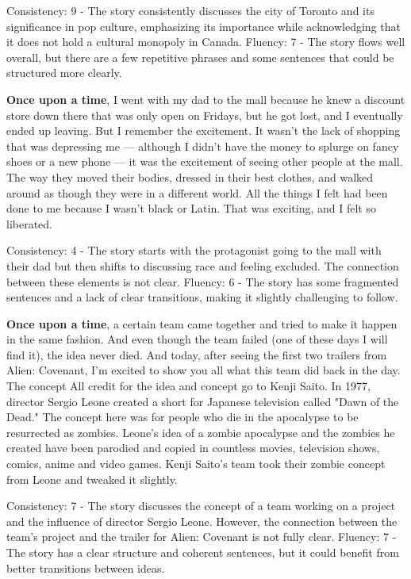 \documentclass{article}
\begin{document}
Consistency: 9 - The story consistently discusses the city of Toronto and its significance in pop culture, emphasizing its importance while acknowledging that it does not hold a cultural monopoly in Canada.
Fluency: 7 - The story flows well overall, but there are a few repetitive phrases and some sentences that could be structured more clearly.

\textbf{Once upon a time}, I went with my dad to the mall because he knew a discount store down there that was only open on Fridays, but he got lost, and I eventually ended up leaving. But I remember the excitement. It wasn't the lack of shopping that was depressing me — although I didn't have the money to splurge on fancy shoes or a new phone — it was the excitement of seeing other people at the mall. The way they moved their bodies, dressed in their best clothes, and walked around as though they were in a different world. All the things I felt had been done to me because I wasn't black or Latin. That was exciting, and I felt so liberated.

Consistency: 4 - The story starts with the protagonist going to the mall with their dad but then shifts to discussing race and feeling excluded. The connection between these elements is not clear.
Fluency: 6 - The story has some fragmented sentences and a lack of clear transitions, making it slightly challenging to follow.

\textbf{Once upon a time}, a certain team came together and tried to make it happen in the same fashion. And even though the team failed (one of these days I will find it), the idea never died.  And today, after seeing the first two trailers from Alien: Covenant, I'm excited to show you all what this team did back in the day.  The concept  All credit for the idea and concept go to Kenji Saito.  In 1977, director Sergio Leone created a short for Japanese television called "Dawn of the Dead." The concept here was for people who die in the apocalypse to be resurrected as zombies. Leone's idea of a zombie apocalypse and the zombies he created have been parodied and copied in countless movies, television shows, comics, anime and video games.  Kenji Saito's team took their zombie concept from Leone and tweaked it slightly.

Consistency: 7 - The story discusses the concept of a team working on a project and the influence of director Sergio Leone. However, the connection between the team's project and the trailer for Alien: Covenant is not fully clear.
Fluency: 7 - The story has a clear structure and coherent sentences, but it could benefit from better transitions between ideas.
\end{document}

